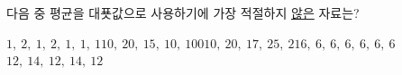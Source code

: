 다음 중 평균을 대푯값으로 사용하기에 가장 적절하지 \underline{않은} 자료는?
\begin{choicesii}{$1,\ 2,\ 1,\ 2,\ 1,\ 1,\ 1$}{$10,\ 20,\ 15,\ 10,\ 100$}{$10,\ 20,\ 17,\ 25,\ 21$}{$6,\ 6,\ 6,\ 6,\ 6,\ 6,\ 6$}{$12,\ 14,\ 12,\ 14,\ 12$}\end{choicesii}

